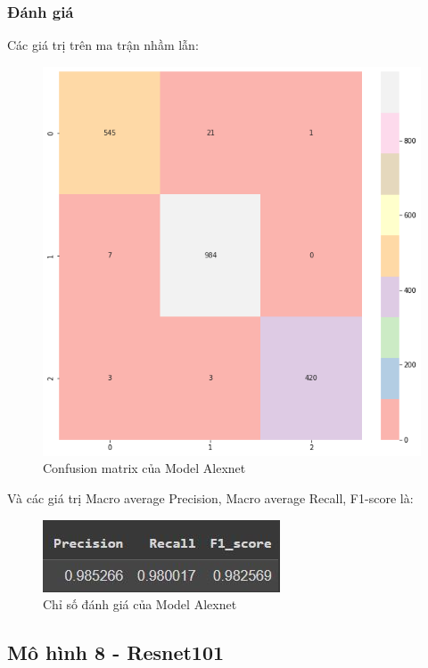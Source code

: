 \subsubsection{Đánh giá}
Các giá trị trên ma trận nhầm lẫn:
\begin{center}
    \begin{figure}[!h]
        \centering
        \includegraphics[scale = 0.38]{fileanh/Alexnet1.png}
        \caption{Confusion matrix của Model Alexnet}
    \end{figure}
\end{center}
Và các giá trị Macro average Precision, Macro average Recall, F1-score là:
\begin{center}
    \begin{figure}[!h]
        \centering
        \includegraphics[scale = 1.2]{fileanh/Alexnet2.jpg}
        \caption{Chỉ số đánh giá của Model Alexnet}
    \end{figure}
\end{center}


\subsection{Mô hình 8 - Resnet101}

